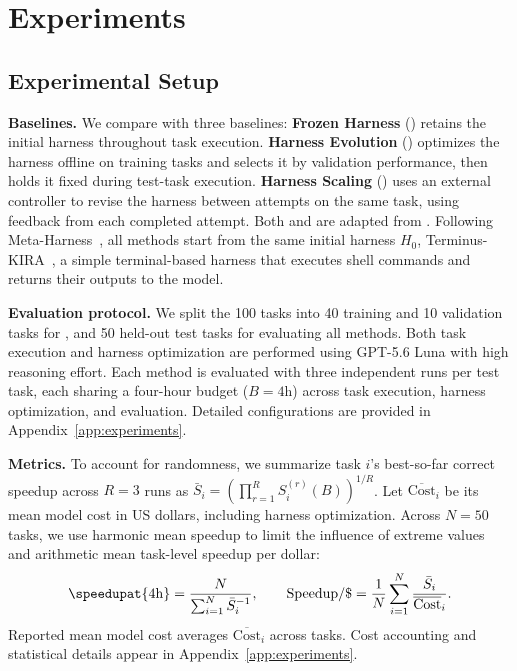 \section{Experiments}
\label{sec:experiments}

\subsection{Experimental Setup}
\label{sec:experiments-setup}

\textbf{Baselines.}
We compare \boxbox{} with three baselines: \textbf{Frozen Harness} (\frozen{}) retains the initial harness throughout task execution. \textbf{Harness Evolution} (\he{}) optimizes the harness offline on training tasks and selects it by validation performance, then holds it fixed during test-task execution. \textbf{Harness Scaling} (\hs{}) uses an external controller to revise the harness between attempts on the same task, using feedback from each completed attempt. Both \he{} and \hs{} are adapted from \citet{wang2026harnessevolution}. Following Meta-Harness~\citep{lee2026metaharness}, all methods start from the same initial harness $H_0$, Terminus-KIRA~\citep{terminuskira2026}, a simple terminal-based harness that executes shell commands and returns their outputs to the model.

\textbf{Evaluation protocol.}
We split the 100 \perfrace{} tasks into 40 training and 10 validation tasks for \he{}, and 50 held-out test tasks for evaluating all methods. Both task execution and harness optimization are performed using GPT-5.6 Luna with high reasoning effort. Each method is evaluated with three independent runs per test task, each sharing a four-hour budget ($B=4\mathrm{h}$) across task execution, harness optimization, and evaluation. Detailed configurations are provided in Appendix~\ref{app:experiments}.

\textbf{Metrics.}
To account for randomness, we summarize task $i$'s best-so-far correct
speedup across $R=3$ runs as
$\bar S_i=\left(\prod_{r=1}^{R}S_i^{(r)}(B)\right)^{1/R}$.
Let $\overline{\mathrm{Cost}}_i$ be its mean model cost in US dollars,
including harness optimization.
Across $N=50$ tasks, we use harmonic mean speedup to limit the influence of
extreme values~\citep{shetty2025gso} and arithmetic mean task-level speedup per dollar:
\begin{equation}
  \speedupat{4\mathrm{h}}=\frac{N}{\sum_{i=1}^{N}\bar S_i^{-1}},
  \qquad
  \mathrm{Speedup/\$}
  =\frac{1}{N}\sum_{i=1}^{N}
    \frac{\bar S_i}{\overline{\mathrm{Cost}}_i}.
  \label{eq:aggregate-speedup}
\end{equation}
Reported mean model cost averages $\overline{\mathrm{Cost}}_i$ across tasks.
Cost accounting and statistical details appear in Appendix~\ref{app:experiments}.

